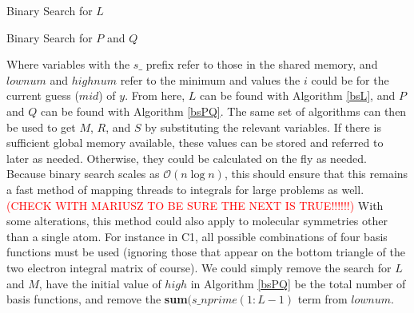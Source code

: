 \documentclass[12pt]{book}
\newcommand{\notetodylan}[1]{\textcolor{red}{#1}} %
\begin{document}
\begin{algorithm}
\caption{Binary Search for $L$}
\label{bsL}
\begin{algorithmic}

		\ENDIF
	\ENDWHILE
\ENDIF

\end{algorithmic}
\end{algorithm}

\begin{algorithm}
\caption{Binary Search for $P$ and $Q$}
\label{bsPQ}
\begin{algorithmic}

		\ENDIF
	\ENDWHILE
\ENDIF

\end{algorithmic}
\end{algorithm}

Where variables with the $s\_$ prefix refer to those in the shared memory, and $lownum$ and $highnum$ refer to the minimum and values the $i$ could be for the current guess ($mid$) of $y$. From here, $L$ can be found with Algorithm \ref{bsL}, and $P$ and $Q$ can be found with Algorithm \ref{bsPQ}. The same set of algorithms can then be used to get $M$, $R$, and $S$ by substituting the relevant variables. If there is sufficient global memory available, these values can be stored and referred to later as needed. Otherwise, they could be calculated on the fly as needed. Because binary search scales as $\mathcal{O}(n\log{}n)$, this should ensure that this remains a fast method of mapping threads to integrals for large problems as well. \notetodylan{(CHECK WITH MARIUSZ TO BE SURE THE NEXT IS TRUE!!!!!!)} With some alterations, this method could also apply to molecular symmetries other than a single atom. For instance in C1, all possible combinations of four basis functions must be used (ignoring those that appear on the bottom triangle of the two electron integral matrix of course). We could simply remove the search for $L$ and $M$, have the initial value of $high$ in Algorithm \ref{bsPQ} be the total number of basis functions, and remove the \textbf{sum}$(s\_nprime(1:L-1)$ term from $lownum$. 
\end{document}
